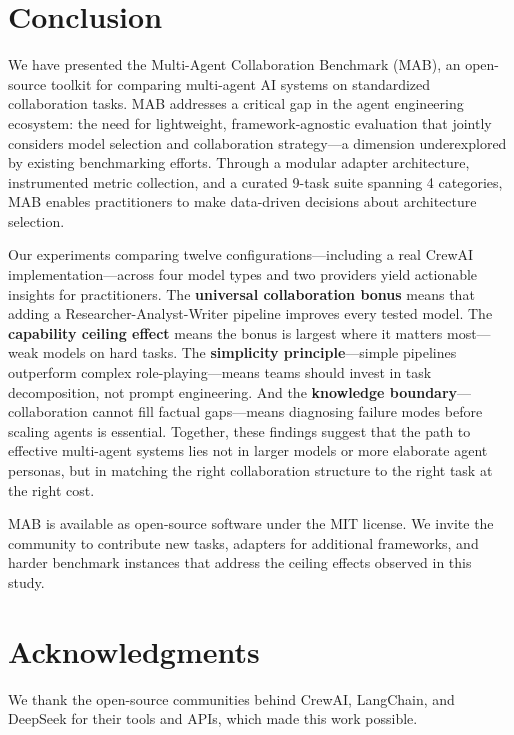 \documentclass[sigconf,nonacm]{acmart}
\begin{document}
\section{Conclusion}

We have presented the Multi-Agent Collaboration Benchmark (MAB), an open-source toolkit for comparing multi-agent AI systems on standardized collaboration tasks. MAB addresses a critical gap in the agent engineering ecosystem: the need for lightweight, framework-agnostic evaluation that jointly considers model selection and collaboration strategy—a dimension underexplored by existing benchmarking efforts. Through a modular adapter architecture, instrumented metric collection, and a curated 9-task suite spanning 4 categories, MAB enables practitioners to make data-driven decisions about architecture selection.

Our experiments comparing twelve configurations—including a real CrewAI implementation—across four model types and two providers yield actionable insights for practitioners. The \textbf{universal collaboration bonus} means that adding a Researcher-Analyst-Writer pipeline improves every tested model. The \textbf{capability ceiling effect} means the bonus is largest where it matters most—weak models on hard tasks. The \textbf{simplicity principle}—simple pipelines outperform complex role-playing—means teams should invest in task decomposition, not prompt engineering. And the \textbf{knowledge boundary}—collaboration cannot fill factual gaps—means diagnosing failure modes before scaling agents is essential. Together, these findings suggest that the path to effective multi-agent systems lies not in larger models or more elaborate agent personas, but in matching the right collaboration structure to the right task at the right cost.

MAB is available as open-source software under the MIT license. We invite the community to contribute new tasks, adapters for additional frameworks, and harder benchmark instances that address the ceiling effects observed in this study.

\section*{Acknowledgments}

We thank the open-source communities behind CrewAI, LangChain, and DeepSeek for their tools and APIs, which made this work possible.
\end{document}
